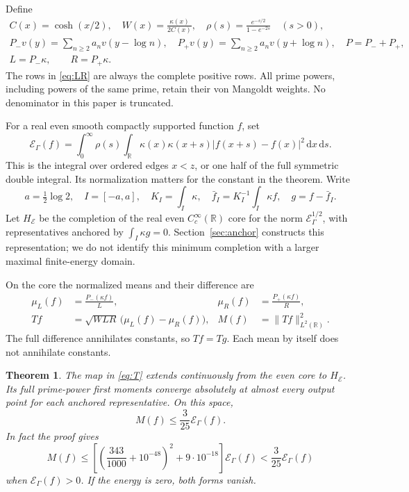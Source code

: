 \documentclass[11pt]{article}
\newtheorem{theorem}{Theorem}[section]
\theoremstyle{remark}\newtheorem{remark}[theorem]{Remark}
\newcommand{\R}{\mathbb R}
\newcommand{\E}{\mathcal E}
\newcommand{\dd}{\,\mathrm d}
\newcommand{\norm}[1]{\lVert #1\rVert}
\numberwithin{equation}{section}
\begin{document}
Define
\begin{gather}
 C(x)=\cosh(x/2),\quad W(x)=\frac{\kappa(x)}{2C(x)},\quad
 \rho(s)=\frac{e^{-s/2}}{1-e^{-2s}}\quad(s>0),\label{eq:weights}\\
 P_-v(y)=\sum_{n\ge2}a_n v(y-\log n),\quad
 P_+v(y)=\sum_{n\ge2}a_n v(y+\log n),\quad P=P_-+P_+,\label{eq:P}\\
 L=P_-\kappa,\qquad R=P_+\kappa.\label{eq:LR}
\end{gather}
The rows in \eqref{eq:LR} are always the complete positive rows. All prime powers, including powers of the same prime, retain their von Mangoldt weights. No denominator in this paper is truncated.

For a real even smooth compactly supported function $f$, set
\begin{equation}\label{eq:energy}
 \E_\Gamma(f)=\int_0^\infty\rho(s)
 \int_\R\kappa(x)\kappa(x+s)|f(x+s)-f(x)|^2\dd x\dd s.
\end{equation}
This is the integral over ordered edges $x<z$, or one half of the full symmetric double integral. Its normalization matters for the constant in the theorem. Write
\begin{equation}\label{eq:anchorconstants}
 a=\tfrac12\log2,\quad I=[-a,a],\quad K_I=\int_I\kappa,
 \quad \bar f_I=K_I^{-1}\int_I\kappa f,\quad g=f-\bar f_I.
\end{equation}
Let $H_\E$ be the completion of the real even $C_c^\infty(\R)$ core for the norm $\E_\Gamma^{1/2}$, with representatives anchored by $\int_I\kappa g=0$. Section~\ref{sec:anchor} constructs this representation; we do not identify this minimum completion with a larger maximal finite-energy domain.

On the core the normalized means and their difference are
\begin{align}
 \mu_L(f)&=\frac{P_-(\kappa f)}{L},&
 \mu_R(f)&=\frac{P_+(\kappa f)}{R},\nonumber\\
 Tf&=\sqrt{WLR}\,\bigl(\mu_L(f)-\mu_R(f)\bigr),&
 M(f)&=\norm{Tf}_{L^2(\R)}^2.\label{eq:T}
\end{align}
The full difference annihilates constants, so $Tf=Tg$. Each mean by itself does not annihilate constants.

\begin{theorem}\label{thm:main}
The map in \eqref{eq:T} extends continuously from the even core to $H_\E$. Its full prime-power first moments converge absolutely at almost every output point for each anchored representative. On this space,
\begin{equation}\label{eq:main}
 M(f)\le \frac{3}{25}\E_\Gamma(f).
\end{equation}
In fact the proof gives
\begin{equation}\label{eq:stronger}
 M(f)\le\left[\left(\frac{343}{1000}+10^{-48}\right)^2
                  +9\cdot10^{-18}\right]\E_\Gamma(f)
       <\frac{3}{25}\E_\Gamma(f)
\end{equation}
when $\E_\Gamma(f)>0$. If the energy is zero, both forms vanish.
\end{theorem}
\end{document}
